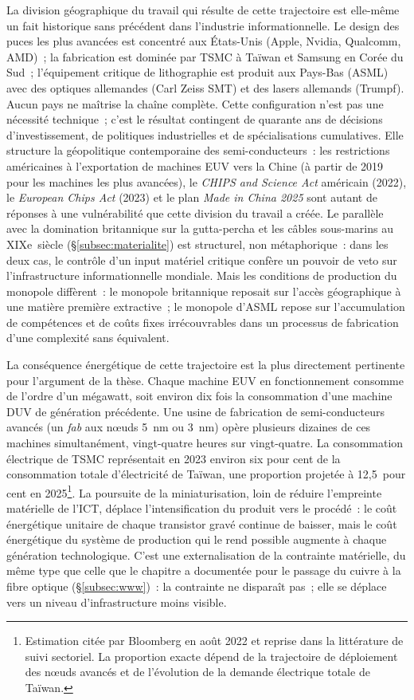 %
La division géographique du travail qui résulte de cette trajectoire est elle-même un fait historique sans précédent dans l'industrie informationnelle. Le design des puces les plus avancées est concentré aux États-Unis (Apple, Nvidia, Qualcomm, AMD)~; la fabrication est dominée par TSMC à Taïwan et Samsung en Corée du Sud~; l'équipement critique de lithographie est produit aux Pays-Bas (ASML) avec des optiques allemandes (Carl Zeiss SMT) et des lasers allemands (Trumpf). Aucun pays ne maîtrise la chaîne complète. Cette configuration n'est pas une nécessité technique~; c'est le résultat contingent de quarante ans de décisions d'investissement, de politiques industrielles et de spécialisations cumulatives. Elle structure la géopolitique contemporaine des semi-conducteurs~: les restrictions américaines à l'exportation de machines EUV vers la Chine (à partir de 2019 pour les machines les plus avancées), le \emph{CHIPS and Science Act} américain (2022), le \emph{European Chips Act} (2023) et le plan \emph{Made in China 2025} sont autant de réponses à une vulnérabilité que cette division du travail a créée. Le parallèle avec la domination britannique sur la gutta-percha et les câbles sous-marins au XIXe~siècle (§\ref{subsec:materialite}) est structurel, non métaphorique~: dans les deux cas, le contrôle d'un input matériel critique confère un pouvoir de veto sur l'infrastructure informationnelle mondiale. Mais les conditions de production du monopole diffèrent~: le monopole britannique reposait sur l'accès géographique à une matière première extractive~; le monopole d'ASML repose sur l'accumulation de compétences et de coûts fixes irrécouvrables dans un processus de fabrication d'une complexité sans équivalent.

%
La conséquence énergétique de cette trajectoire est la plus directement pertinente pour l'argument de la thèse. Chaque machine EUV en fonctionnement consomme de l'ordre d'un mégawatt, soit environ dix fois la consommation d'une machine DUV de génération précédente. Une usine de fabrication de semi-conducteurs avancés (un \emph{fab} aux n{\oe}uds 5~nm ou 3~nm) opère plusieurs dizaines de ces machines simultanément, vingt-quatre heures sur vingt-quatre. La consommation électrique de TSMC représentait en 2023 environ six pour cent de la consommation totale d'électricité de Taïwan, une proportion projetée à 12,5~pour cent en 2025\footnote{Estimation citée par Bloomberg en août 2022 et reprise dans la littérature de suivi sectoriel. La proportion exacte dépend de la trajectoire de déploiement des n{\oe}uds avancés et de l'évolution de la demande électrique totale de Taïwan.}. La poursuite de la miniaturisation, loin de réduire l'empreinte matérielle de l'ICT, déplace l'intensification du produit vers le procédé~: le coût énergétique unitaire de chaque transistor gravé continue de baisser, mais le coût énergétique du système de production qui le rend possible augmente à chaque génération technologique. C'est une externalisation de la contrainte matérielle, du même type que celle que le chapitre a documentée pour le passage du cuivre à la fibre optique (§\ref{subsec:www})~: la contrainte ne disparaît pas~; elle se déplace vers un niveau d'infrastructure moins visible.

